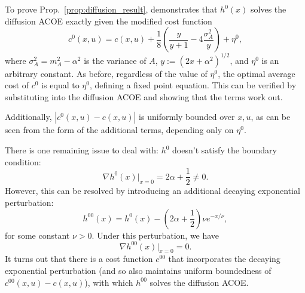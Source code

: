 \documentclass[11pt]{article}
\begin{document}
To prove Prop.~\ref{prop:diffusion_result}, \cite{paper} demonstrates that $h^0(x)$ solves the diffusion ACOE exactly given the modified cost function
$$c^0(x,u) = c(x,u) + \frac{1}{8} \left( \frac{y}{y+1} - 4 \frac{\sigma_A^2}{y}\right) + \eta^0,$$
where $\sigma_A^2 = m_A^2 - \alpha^2$ is the variance of $A$, $y:= (2x+\alpha^2)^{1/2}$, and $\eta^0$ is an arbitrary constant. As before, regardless of the value of $\eta^0$, the optimal average cost of $c^0$ is equal to $\eta^0$, defining a fixed point equation. This can be verified by substituting into the diffusion ACOE and showing that the terms work out.

Additionally, $|c^0(x,u) - c(x,u)|$ is uniformly bounded over $x,u$, as can be seen from the form of the additional terms, depending only on $\eta^0$.

There is one remaining issue to deal with: $h^0$ doesn't satisfy the boundary condition:
$$\nabla h^0(x) \vert_{x=0} = 2\alpha + \frac{1}{2} \neq 0.$$
However, this can be resolved by introducing an additional decaying exponential perturbation:
$$h^{00}(x) = h^0(x) - \left(2\alpha + \frac{1}{2}\right) \nu e^{-x/\nu},$$
for some constant $\nu>0$.
Under this perturbation, we have
$$\nabla h^{00}(x) \vert_{x=0} = 0.$$
It turns out that there is a cost function $c^{00}$ that incorporates the decaying exponential perturbation (and so also maintains uniform boundedness of $c^{00}(x,u)-c(x,u)$), with which $h^{00}$ solves the diffusion ACOE.
\end{document}
